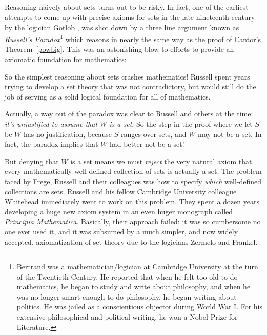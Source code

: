 \subsection{}

Reasoning naively about sets turns out to be risky.  In fact, one of
the earliest attempts to come up with precise axioms for sets in the
late nineteenth century by the logician Gotlob , was shot
down by a three line argument known as \emph{Russell's
  Paradox}\footnote{Bertrand  was a
  mathematician/logician at Cambridge University at the turn of the
  Twentieth Century.  He reported that when he felt too old to do
  mathematics, he began to study and write about philosophy, and when
  he was no longer smart enough to do philosophy, he began writing
  about politics.  He was jailed as a conscientious objector during
  World War I.  For his extensive philosophical and political writing,
  he won a Nobel Prize for Literature.} which reasons in nearly the
same way as the proof of Cantor's Theorem~\ref{powbig}.  This was an
astonishing blow to efforts to provide an axiomatic foundation for
mathematics:


So the simplest reasoning about sets crashes mathematics!  Russell
spent years trying to develop a set theory that was not contradictory,
but would still do the job of serving as a solid logical foundation
for all of mathematics.

Actually, a way out of the paradox was clear to Russell and others at
the time: \emph{it's unjustified to assume that $W$ is a set}.  So the
step in the proof where we let $S$ be $W$ has no justification,
because $S$ ranges over sets, and $W$ may not be a set.  In fact, the
paradox implies that $W$ had better not be a set!

But denying that $W$ is a set means we must \emph{reject} the very
natural axiom that every mathematically well-defined collection of
sets is actually a set.  The problem faced by Frege, Russell and their
colleagues was how to specify \emph{which} well-defined collections
are sets.  Russell and his fellow Cambridge University colleague
Whitehead immediately went to work on this problem.  They spent a
dozen years developing a huge new axiom system in an even huger
monograph called \emph{Principia Mathematica}.  Basically, their
approach failed: it was so cumbersome no one ever used it, and it was
subsumed by a much simpler, and now widely accepted, axiomatization of
set theory due to the logicians Zermelo and Frankel.

